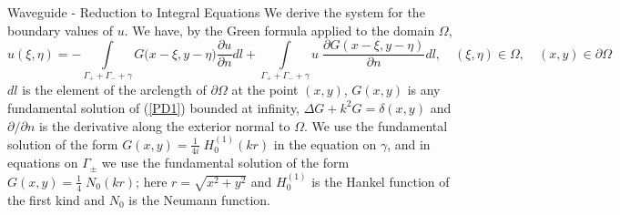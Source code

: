 \documentclass{beamer}
\newcommand{\ds}{\displaystyle}
\begin{document}
\begin{frame}{Waveguide - Reduction to Integral Equations}
We derive the system  for the boundary values of $u$. We have, by the Green formula applied to the domain $\Omega$, 
\begin{equation}\label{GF}
u(\xi,\eta)=-\ds\int\limits_{\Gamma_{+}+\Gamma_{-}+\gamma} G\Big(x-\xi,y-\eta\Big)\ds\frac{\partial u}{\partial n} dl+\ds\int\limits_{\Gamma_{+}+\Gamma_{-}+\gamma} u\;\ds\frac{\partial G(x-\xi,y-\eta)}{\partial n} dl,\quad(\xi,\eta)\in\Omega,\quad(x,y)\in\partial\Omega
\end{equation}
$dl$ is the element of the arclength of $\partial\Omega$ at the point $(x,y)$, $G(x,y)$ is any fundamental solution of (\ref{PD1}) bounded at infinity, $\Delta G+k^2 G=\delta(x,y)$ and $\partial/\partial n$ is the derivative along the exterior normal to $\Omega$.
 We use the fundamental solution of the form $G(x,y)=\ds\frac{1}{4i}\;H_{0}^{(1)}(k r)$ in the equation on $\gamma$, and in equations on $\Gamma_\pm$  we use the fundamental solution of the form  $G(x,y)=\ds\frac{1}{4}\;N_{0}(k r)$; here $r=\sqrt{x^2+y^2}$ and $H_0^{(1)}$ is the Hankel function of the first kind and $N_0$ is the Neumann function.
\end{frame}
\end{document}
